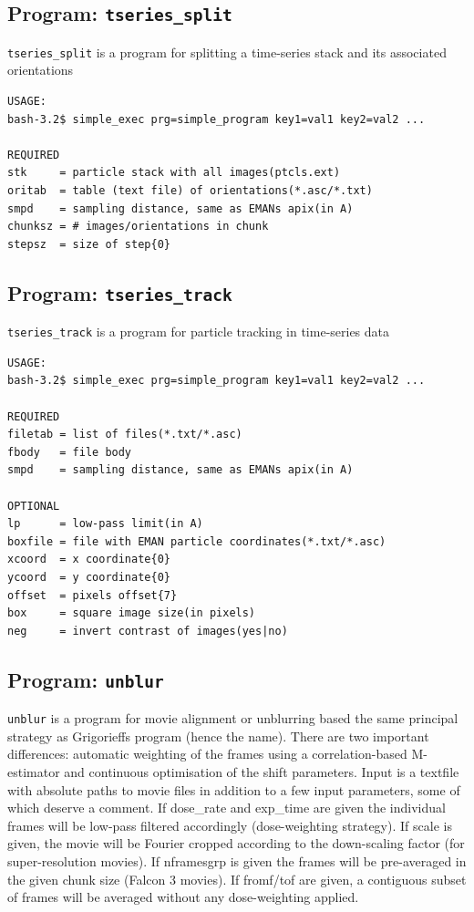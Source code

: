 \documentclass[a4paper,11pt]{article}
\newcommand{\prgname}[1]{\textcolor{NavyBlue}{\texttt{#1}}}
\begin{document}
\subsection{Program: \prgname{tseries\_split}}
\label{tseries_split}
\prgname{tseries\_split} is a program for splitting a time-series stack and its associated orientations 

\begin{verbatim}
USAGE:
bash-3.2$ simple_exec prg=simple_program key1=val1 key2=val2 ...

REQUIRED
stk     = particle stack with all images(ptcls.ext)
oritab  = table (text file) of orientations(*.asc/*.txt)
smpd    = sampling distance, same as EMANs apix(in A)
chunksz = # images/orientations in chunk
stepsz  = size of step{0}
\end{verbatim}

\subsection{Program: \prgname{tseries\_track}}
\label{tseries_track}
\prgname{tseries\_track} is a program for particle tracking in time-series data 

\begin{verbatim}
USAGE:
bash-3.2$ simple_exec prg=simple_program key1=val1 key2=val2 ...

REQUIRED
filetab = list of files(*.txt/*.asc)
fbody   = file body
smpd    = sampling distance, same as EMANs apix(in A)

OPTIONAL
lp      = low-pass limit(in A)
boxfile = file with EMAN particle coordinates(*.txt/*.asc)
xcoord  = x coordinate{0}
ycoord  = y coordinate{0}
offset  = pixels offset{7}
box     = square image size(in pixels)
neg     = invert contrast of images(yes|no)
\end{verbatim}

\subsection{Program: \prgname{unblur}}
\label{unblur}
\prgname{unblur} is a program for movie alignment or unblurring based the same principal strategy as Grigorieffs program (hence the name). There are two important differences: automatic weighting of the frames using a correlation-based M-estimator and continuous optimisation of the shift parameters. Input is a textfile with absolute paths to movie files in addition to a few input parameters, some of which deserve a comment. If dose\_rate and exp\_time are given the individual frames will be low-pass filtered accordingly (dose-weighting strategy). If scale is given, the movie will be Fourier cropped according to the down-scaling factor (for super-resolution movies). If nframesgrp is given the frames will be pre-averaged in the given chunk size (Falcon 3 movies). If fromf/tof are given, a contiguous subset of frames will be averaged without any dose-weighting applied. 
\end{document}
